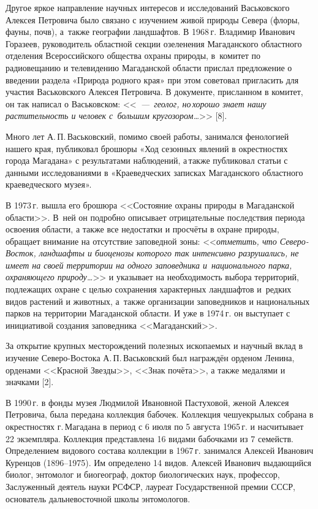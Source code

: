 Другое яркое направление научных интересов и исследований Васьковского Алексея Петровича было связано с изучением живой природы Севера (флоры, фауны, почв), а~также географии ландшафтов. В 1968\,г. Владимир Иванович Горазеев, руководитель областной секции озеленения Магаданского областного отделения Всероссийского общества охраны природы, в~комитет по радиовещанию и телевидению Магаданской области прислал предложение о введении раздела «Природа родного края» при этом советовал пригласить для участия Васьковского Алексея Петровича. В документе, присланном в комитет, он так написал о Васьковском: <<\textit{\mbox{~--- геолог,} но\,хорошо знает нашу растительность и человек с~большим кругозором\dots}>> [8].

Много лет А.\,П.\,Васьковский, помимо своей работы, занимался фенологией нашего края, публиковал брошюры «Ход сезонных явлений в окрестностях города Магадана» с результатами наблюдений, а\,также публиковал статьи с данными исследованиями в «Краеведческих записках Магаданского областного краеведческого музея».

В 1973\,г. вышла его брошюра <<Состояние охраны природы в Магаданской области>>. В~ней он подробно описывает отрицательные последствия периода освоения области, а также все недостатки и просчёты в охране природы, обращает внимание на отсутствие заповедной зоны: <<\textit{ отметить, что Северо-Восток, ландшафты и биоценозы которого так интенсивно разрушались, не имеет на своей территории на одного заповедника и~национального парка, охраняющего природу\dots}>> и указывает на необходимость выбора территорий, подлежащих охране с целью сохранения характерных ландшафтов и~редких видов растений и животных, а~также организации заповедников и национальных парков на территории Магаданской области. И уже в 1974\,г. он выступает с инициативой создания заповедника <<Магаданский>>.

За открытие крупных месторождений полезных ископаемых и научный вклад в изучение Северо-Востока А.\,П.\,Васьковский был награждён орденом Ленина, орденами <<Красной Звезды>>, <<Знак почёта>>, а также медалями и значками [2].

В 1990\,г. в фонды музея Людмилой Ивановной Пастуховой, женой Алексея Петровича, была передана коллекция бабочек. Коллекция чешуекрылых собрана в окрестностях г.\,Магадана в период с 6 июля по 5 августа 1965\,г. и насчитывает 22 экземпляра. Коллекция представлена 16 видами бабочками из 7 семейств. Определением видового состава коллекции в 1967\,г. занимался Алексей Иванович Куренцов (1896--1975). Им определено 14 видов.
Алексей Иванович выдающийся биолог, энтомолог и биогеограф, доктор биологических наук, профессор, Заслуженный деятель науки РСФСР, лауреат Государственной премии СССР, основатель дальневосточной школы энтомологов.

